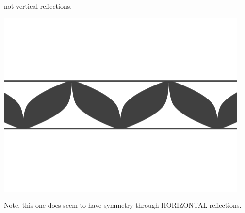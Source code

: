\documentclass[noauthor,nooutcomes,12pt,hints,handout]{ximera}
\begin{document}
\begin{question}
\begin{freeResponse}
\begin{enumerate}
      not vertical-reflections.
        \begin{center}
          \includegraphics[width=.6\textwidth]{ansRGR.png}
        \end{center}
        Note, this one does seem to have symmetry through HORIZONTAL
        reflections.
    \end{enumerate}
  \end{freeResponse}
\end{question}
\end{document}
